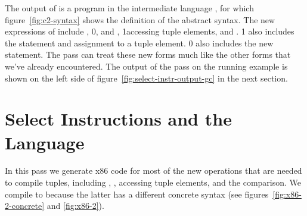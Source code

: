 \documentclass[7x10]{TimesAPriori_MIT}%
\def\racketEd{0}
\def\pythonEd{1}
\providecommand{\BookEdition}{1}
\let\edition\BookEdition
\newcommand{\racket}[1]{{\if\edition\racketEd{#1}\fi}}
\newcommand{\pythonColor}[0]{}
\newcommand{\python}[1]{{\if\edition\pythonEd\pythonColor #1\fi}}
\numberwithin{theorem}{chapter}
\numberwithin{definition}{chapter}
\numberwithin{equation}{chapter}
\begin{document}
The output of  is a program in the
intermediate language \LangCVec{}, for which figure~\ref{fig:c2-syntax}
shows the definition of the abstract syntax.
%
%
The new expressions of \LangCVec{} include ,
%
\racket{, and ,}
%
\python{accessing tuple elements,}
%
and .
%
\python{\LangCVec{} also includes the  statement and
assignment to a tuple element.}
%
\racket{\LangCVec{} also includes the new \code{collect} statement.}
%
The  pass can treat these new forms much like
the other forms that we've already encountered.  The output of the
 pass on the running example is shown on the
left side of figure~\ref{fig:select-instr-output-gc} in the next
section.


\section{Select Instructions and the \LangXGlobal{} Language}
\label{sec:select-instructions-gc}


In this pass we generate x86 code for most of the new operations that
are needed to compile tuples, including ,
, accessing tuple elements, and the 
comparison.
%
We compile  to  because the latter has a
different concrete syntax (see figures~\ref{fig:x86-2-concrete} and
\ref{fig:x86-2}).  
\end{document}
